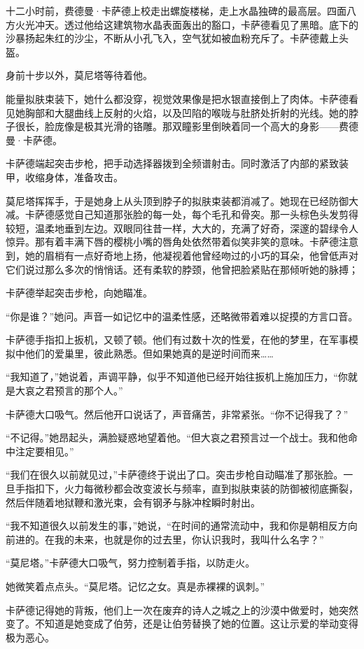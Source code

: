 \documentclass[AutoFakeBold=true]{book}
\begin{document}
十二小时前，费德曼·卡萨德上校走出螺旋楼梯，走上水晶独碑的最高层。四面八方火光冲天。透过他给这建筑物水晶表面轰出的豁口，卡萨德看见了黑暗。底下的沙暴扬起朱红的沙尘，不断从小孔飞入，空气犹如被血粉充斥了。卡萨德戴上头盔。

身前十步以外，莫尼塔等待着他。

能量拟肤束装下，她什么都没穿，视觉效果像是把水银直接倒上了肉体。卡萨德看见她胸部和大腿曲线上反射的火焰，以及凹陷的喉咙与肚脐处折射的光线。她的脖子很长，脸庞像是极其光滑的铬雕。那双瞳影里倒映着同一个高大的身影——费德曼·卡萨德。

卡萨德端起突击步枪，把手动选择器拨到全频谱射击。同时激活了内部的紧致装甲，收缩身体，准备攻击。

莫尼塔挥挥手，于是她身上从头顶到脖子的拟肤束装都消减了。她现在已经防御大减。卡萨德感觉自己知道那张脸的每一处，每个毛孔和骨突。那一头棕色头发剪得较短，温柔地垂到左边。双眼同往昔一样，大大的，充满了好奇，深邃的碧绿令人惊异。那有着丰满下唇的樱桃小嘴的唇角处依然带着似笑非笑的意味。卡萨德注意到，她的眉梢有一点好奇地上扬，他凝视着他曾经吻过的小巧的耳朵，他曾低声对它们说过那么多次的悄悄话。还有柔软的脖颈，他曾把脸紧贴在那倾听她的脉搏；

卡萨德举起突击步枪，向她瞄准。

``你是谁？''她问。声音一如记忆中的温柔性感，还略微带着难以捉摸的方言口音。

卡萨德手指扣上扳机，又顿了顿。他们有过数十次的性爱，在他的梦里，在军事模拟中他们的爱巢里，彼此熟悉。但如果她真的是逆时间而来……

``我知道了，''她说着，声调平静，似乎不知道他已经开始往扳机上施加压力，``你就是大哀之君预言的那个人。''

卡萨德大口吸气。然后他开口说话了，声音痛苦，非常紧张。``你不记得我了？''

``不记得。''她昂起头，满脸疑惑地望着他。``但大哀之君预言过一个战士。我和他命中注定要相见。''

``我们在很久以前就见过，''卡萨德终于说出了口。突击步枪自动瞄准了那张脸。一旦手指扣下，火力每微秒都会改变波长与频率，直到拟肤束装的防御被彻底撕裂，然后伴随着地狱鞭和激光束，会有钢矛与脉冲栓瞬时射出。

``我不知道很久以前发生的事，''她说，``在时间的通常流动中，我和你是朝相反方向前进的。在我的未来，也就是你的过去里，你认识我时，我叫什么名字？''

``莫尼塔。''卡萨德大口吸气，努力控制着手指，以防走火。

她微笑着点点头。``莫尼塔。记忆之女。真是赤裸裸的讽刺。''

卡萨德记得她的背叛，他们上一次在废弃的诗人之城之上的沙漠中做爱时，她突然{\kaishu 变了}。不知道是她变成了伯劳，还是让伯劳替换了她的位置。这让示爱的举动变得极为恶心。
\end{document}
